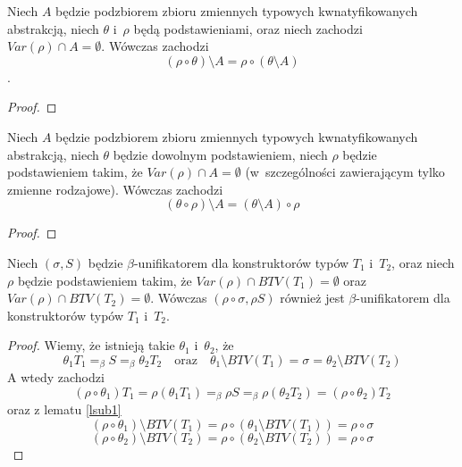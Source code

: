 \documentclass[11pt,leqno]{article}
\begin{document}
\begin{lemat}
Niech $A$ będzie podzbiorem zbioru zmiennych typowych kwnatyfikowanych abstrakcją, niech $\theta$ i~$\rho$ będą podstawieniami, oraz
niech zachodzi $Var(\rho) \cap A = \emptyset$. Wówczas zachodzi 
\[
(\rho \circ \theta) \setminus A = \rho \circ (\theta \setminus A)
\].
\label{lsub1}
\end{lemat}
\begin{proof}
\end{proof}

\begin{lemat}
Niech $A$ będzie podzbiorem zbioru zmiennych typowych kwnatyfikowanych abstrakcją, niech $\theta$ będzie dowolnym podstawieniem,
niech $\rho$ będzie podstawieniem takim, że $Var(\rho) \cap A = \emptyset$ (w~szczególności zawierającym tylko zmienne rodzajowe). 
Wówczas zachodzi
\[
(\theta \circ \rho) \setminus A = (\theta \setminus A) \circ \rho
\]
\label{lsub2}
\end{lemat}
\begin{proof}
\end{proof}

\begin{lemat}
Niech $(\sigma, S)$ będzie $\beta$-unifikatorem dla konstruktorów typów $T_1$ i~$T_2$, oraz niech $\rho$ będzie 
podstawieniem takim, że $Var(\rho) \cap BTV(T_1) = \emptyset$ oraz $Var(\rho) \cap BTV(T_2) = \emptyset$.
Wówczas $(\rho \circ \sigma, \rho S)$ również jest $\beta$-unifikatorem dla konstruktorów typów $T_1$ i~$T_2$.
\label{lunif1}
\end{lemat}
\begin{proof}
Wiemy, że istnieją takie $\theta_1$ i~$\theta_2$, że
\[
\theta_1 T_1 =_\beta S =_\beta \theta_2 T_2 \quad \textrm{oraz} \quad \theta_1 \setminus BTV(T_1) = \sigma = \theta_2 \setminus BTV(T_2)
\]
A wtedy zachodzi
\[
(\rho \circ \theta_1)T_1 = \rho(\theta_1 T_1) =_\beta \rho S =_\beta \rho(\theta_2 T_2) = (\rho \circ \theta_2)T_2
\]
oraz z lematu \ref{lsub1}
\[
(\rho \circ \theta_1) \setminus BTV(T_1) = \rho \circ (\theta_1 \setminus BTV(T_1)) = \rho \circ \sigma
\]
\[
(\rho \circ \theta_2) \setminus BTV(T_2) = \rho \circ (\theta_2 \setminus BTV(T_2)) = \rho \circ \sigma
\]
\end{proof}
\end{document}
